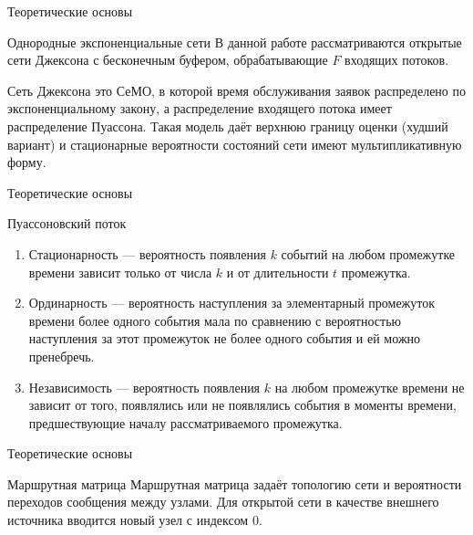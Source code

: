 \documentclass[aspectratio=169]{beamer}
\begin{document}
\begin{frame}{Теоретические основы}
\begin{block}{Однородные экспоненциальные сети}
В данной работе рассматриваются открытые сети Джексона с бесконечным буфером, обрабатывающие \( F \) входящих потоков.

Сеть Джексона это СеМО, в которой время обслуживания заявок распределено по экспоненциальному закону, а распределение входящего потока имеет распределение Пуассона. Такая модель даёт верхнюю границу оценки (худший вариант)
и стационарные вероятности состояний сети имеют мультипликативную форму.
\end{block}	
\end{frame}

\begin{frame}{Теоретические основы}
\begin{block}{Пуассоновский поток}
\begin{enumerate}
	\item Стационарность --- вероятность появления \( k \) событий на любом промежутке времени зависит только от числа \( k \) и от длительности
	\( t \) промежутка.
	
	\item Ординарность --- вероятность наступления за элементарный промежуток времени более одного события мала по сравнению с вероятностью
	наступления за этот промежуток не более одного события и ей можно пренебречь.
	
	\item Независимость --- вероятность появления \( k \) на любом промежутке времени не зависит от того, появлялись или не появлялись
	события в моменты времени, предшествующие началу рассматриваемого промежутка.
\end{enumerate}
\end{block}
\end{frame}

\begin{frame}{Теоретические основы}
\begin{block}{Маршрутная матрица}
Маршрутная матрица задаёт топологию сети и вероятности переходов сообщения между узлами.
Для открытой сети в качестве внешнего источника вводится новый узел с индексом \( 0 \).
\end{block}
\end{frame}
\end{document}
